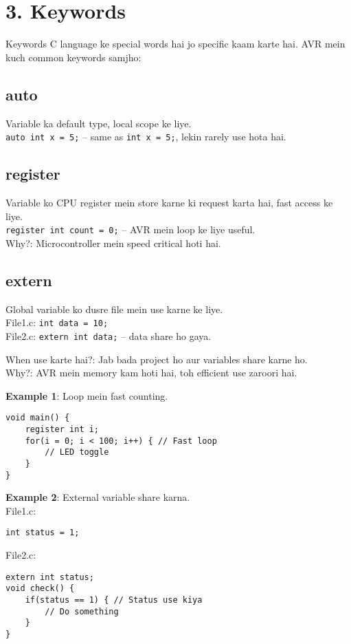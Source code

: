 \documentclass[a4paper,12pt]{article}
\begin{document}
\section*{\textbf{\LARGE \textcolor{headingblue}{3. Keywords}}}
Keywords C language ke special words hai jo specific kaam karte hai. AVR mein kuch common keywords samjho:

\subsection*{auto}
Variable ka default type, local scope ke liye. \\
\texttt{auto int x = 5;} – same as \texttt{int x = 5;}, lekin rarely use hota hai.

\subsection*{register}
Variable ko CPU register mein store karne ki request karta hai, fast access ke liye. \\
\texttt{register int count = 0;} – AVR mein loop ke liye useful. \\
\textcolor{warningred}{Why?}: Microcontroller mein speed critical hoti hai.

\subsection*{extern}
Global variable ko dusre file mein use karne ke liye. \\
File1.c: \texttt{int data = 10;} \\
File2.c: \texttt{extern int data;} – data share ho gaya.

\textcolor{warningred}{When use karte hai?}: Jab bada project ho aur variables share karne ho. \\
\textcolor{warningred}{Why?}: AVR mein memory kam hoti hai, toh efficient use zaroori hai.

\begin{examplebox}
\textbf{Example 1}: Loop mein fast counting. \\
\begin{lstlisting}
void main() {
    register int i;
    for(i = 0; i < 100; i++) { // Fast loop
        // LED toggle
    }
}
\end{lstlisting}
\end{examplebox}

\begin{examplebox}
\textbf{Example 2}: External variable share karna. \\
File1.c: \\
\begin{lstlisting}
int status = 1;
\end{lstlisting}
File2.c: \\
\begin{lstlisting}
extern int status;
void check() {
    if(status == 1) { // Status use kiya
        // Do something
    }
}
\end{lstlisting}
\end{examplebox}
\end{document}
